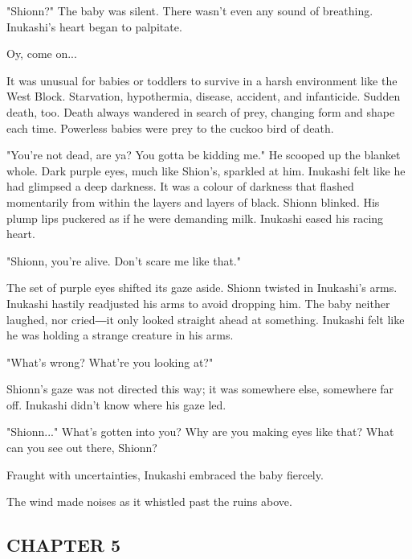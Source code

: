 "Shionn?" The baby was silent. There wasn't even any sound of breathing.
Inukashi's heart began to palpitate.

Oy, come on...

It was unusual for babies or toddlers to survive in a harsh environment
like the West Block. Starvation, hypothermia, disease, accident, and
infanticide. Sudden death, too. Death always wandered in search of prey,
changing form and shape each time. Powerless babies were prey to the
cuckoo bird of death.

"You're not dead, are ya? You gotta be kidding me." He scooped up the
blanket whole. Dark purple eyes, much like Shion's, sparkled at him.
Inukashi felt like he had glimpsed a deep darkness. It was a colour of
darkness that flashed momentarily from within the layers and layers of
black. Shionn blinked. His plump lips puckered as if he were demanding
milk. Inukashi eased his racing heart.

"Shionn, you're alive. Don't scare me like that."

The set of purple eyes shifted its gaze aside. Shionn twisted in
Inukashi's arms. Inukashi hastily readjusted his arms to avoid dropping
him. The baby neither laughed, nor cried―it only looked straight ahead
at something. Inukashi felt like he was holding a strange creature in
his arms.

"What's wrong? What're you looking at?"

Shionn's gaze was not directed this way; it was somewhere else,
somewhere far off. Inukashi didn't know where his gaze led.

"Shionn..." What's gotten into you? Why are you making eyes like that?
What can you see out there, Shionn?

Fraught with uncertainties, Inukashi embraced the baby fiercely.

The wind made noises as it whistled past the ruins above.

\hypertarget{index_split_078.htmlux5cux23calibre_pb_97}{}

\protect\hypertarget{index_split_094.html}{}{}

\hypertarget{index_split_094.htmlux5cux23calibre_pb_0}{}

\hypertarget{index_split_094.htmlux5cux23calibre_toc_6}{%
\subsection{CHAPTER 5}\label{index_split_094.htmlux5cux23calibre_toc_6}}

